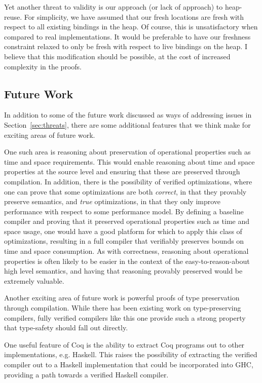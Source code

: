Yet another threat to validity is our approach (or lack of approach) to
heap-reuse. For simplicity, we have assumed that our fresh locations are fresh
with respect to all existing bindings in the heap. Of course, this is
unsatisfactory when compared to real implementations. It would be preferable to
have our freshness constraint relaxed to only be fresh with respect to live
bindings on the heap. I believe that this modification should be possible, at
the cost of increased complexity in the proofs. 

\subsection{Future Work}

In addition to some of the future work discussed as ways of addressing issues 
in Section~\ref{sec:threats}, there are some additional features that we think
make for exciting areas of future work. 

One such area is reasoning about preservation of operational properties such as
time and space requirements. This would enable reasoning about time and space
properties at the source level and ensuring that these are preserved through
compilation. In addition, there is the possibility of verified optimizations,
where one can prove that some optimizations are both \emph{correct}, in that
they provably preserve semantics, and \emph{true} optimizations, in that they
only improve performance with respect to some performance model. By defining a
baseline compiler and proving that it preserved operational properties such as
time and space usage, one would have a good platform for which to apply this
class of optimizations, resulting in a full compiler that verifiably preserves 
bounds on time and space consumption. As with correctness, reasoning about
operational properties is often likely to be easier in the context of the
easy-to-reason-about high level semantics, and having that reasoning provably
preserved would be extremely valuable. 

Another exciting area of future work is powerful proofs of type preservation
through compilation.  While there has been existing work on type-preserving
compilers, fully verified compilers like this one provide such a strong property
that type-safety should fall out directly.

One useful feature of Coq is the ability to extract Coq programs out to other
implementations, e.g. Haskell. This raises the possibility of extracting the
verified compiler out to a Haskell implementation that could be incorporated
into GHC, providing a path towards a verified Haskell compiler. 


